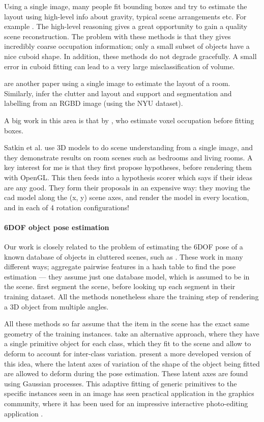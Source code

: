 \documentclass[10pt,twocolumn,letterpaper]{article}
\makeatletter
\newcommand*{\ea}{et al.\@\xspace}
\makeatother
\begin{document}
Using a single image, many people fit bounding boxes and try to estimate the layout using high-level info about gravity, typical scene arrangements etc. 
For example \cite{choi-cvpr-2013, shao-siggraphasia-2014}.
The high-level reasoning gives a great opportunity to gain a quality scene reconstruction.
The problem with these methods is that they gives incredibly coarse occupation information; only a small subset of objects have a nice cuboid shape.
In addition, these methods do not degrade gracefully.
A small error in cuboid fitting can lead to a very large misclassification of volume.

\cite{lee-nips-2010} are another paper using a single image to estimate the layout of a room. 
Similarly, \cite{zhang-iccv-2013} infer the clutter and layout and support and segmentation and labelling from an RGBD image (using the NYU dataset).

A big work in this area is that by \cite{gupta-cvpr-2011}, who estimate voxel occupation before fitting boxes.

Satkin \ea \cite{satkin-bmvc-2012} use 3D models to do scene understanding from a single image, and they demonstrate results on room scenes such as bedrooms and living rooms. 
A key interest for me is that they first propose hypotheses, before rendering them with OpenGL.
This then feeds into a hypothesis scorer which says if their ideas are any good. 
They form their proposals in an expensive way: they moving the cad model along the (x, y) scene axes, and render the model in every location, and in each of 4 rotation configurations!

\paragraph{6DOF object pose estimation}
Our work is closely related to the problem of estimating the 6DOF pose of a known database of objects in cluttered scenes, such as \cite{hinterstoisser-accv-2012, drost-3dimpvt-2012, rusu-iros-2010}. 
These work in many different ways; \cite{drost-3dimpvt-2012} aggregate pairwise features in a hash table to find the pose estimation --- they assume just one database model, which is assumed to be in the scene. \cite{rusu-iros-2010} first segment the scene, before looking up each segment in their training dataset.
All the methods nonetheless share the training step of rendering a 3D object from multiple angles.

All these methods so far assume that the item in the scene has the exact same geometry of the training instances.
\cite{cocias-cgvcv-2013} take an alternative approach, where they have a single primitive object for each class, which they fit to the scene and allow to deform to account for inter-class variation.
\cite{prisacariu-iccv-2011} present a more developed version of this idea, where the latent axes of variation of the shape of the object being fitted are allowed to deform during the pose estimation. 
These latent axes are found using Gaussian processes.
This adaptive fitting of generic primitives to the specific instances seen in an image has seen practical application in the graphics community, where it has been used for an impressive interactive photo-editing application \cite{kholgade-siggraph-2014}.
\end{document}
